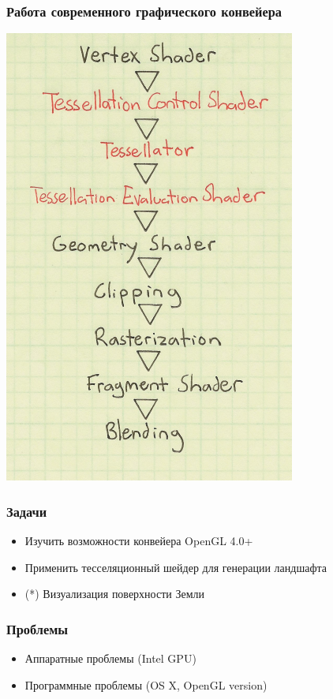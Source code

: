 \documentclass{beamer}
\begin{document}
    \begin{frame}\frametitle{Работа современного графического конвейера}
	    \begin{center}
        	\includegraphics[scale=1.3]{ShaderStages.png}\\
        \end{center}
    \end{frame}

    \begin{frame}\frametitle{Задачи}
        \begin{itemize}%
            \item   Изучить возможности конвейера OpenGL 4.0+
            \item   Применить тесселяционный шейдер для генерации ландшафта
            \item   (*) Визуализация поверхности Земли
        \end{itemize}
    \end{frame}
    
    \begin{frame}\frametitle{Проблемы}
        \begin{itemize}%
            \item   Аппаратные проблемы (Intel GPU)
            \item   Программные проблемы (OS X, OpenGL version)
        \end{itemize}
    \end{frame}
    
\end{document}

